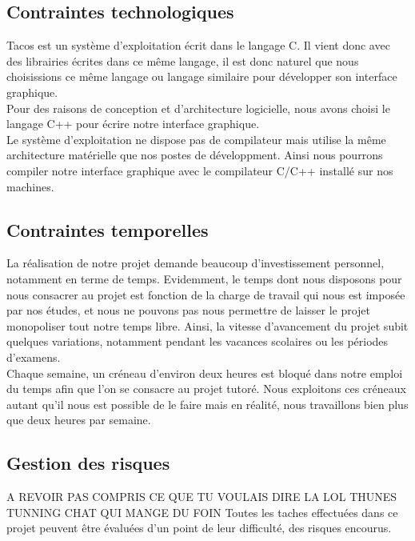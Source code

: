 
\subsection{Contraintes technologiques}

Tacos est un système d'exploitation écrit dans le langage C. Il vient donc avec des librairies écrites dans ce même langage, il est donc naturel que nous choisissions ce même langage ou langage similaire pour développer son interface graphique. \\

Pour des raisons de conception et d'architecture logicielle, nous avons choisi le langage C++ pour écrire notre interface graphique. \\
Le système d'exploitation ne dispose pas de compilateur mais utilise la même architecture matérielle que nos postes de développment. Ainsi nous pourrons compiler notre interface graphique avec le compilateur C/C++ installé sur nos machines.

\subsection{Contraintes temporelles}

La réalisation de notre projet demande beaucoup d'investissement personnel, notamment en terme de temps. Evidemment, le temps dont nous disposons pour nous consacrer au projet est fonction de la charge de travail qui nous est imposée par nos études, et nous ne pouvons pas nous permettre de laisser le projet monopoliser tout notre temps libre. Ainsi, la vitesse d'avancement du projet subit quelques variations, notamment pendant les vacances scolaires ou les périodes d'examens. \\

Chaque semaine, un créneau d'environ deux heures est bloqué dans notre emploi du temps afin que l'on se consacre au projet tutoré. Nous exploitons ces créneaux autant qu'il nous est possible de le faire mais en réalité, nous travaillons bien plus que deux heures par semaine.
\subsection{Gestion des risques}
A REVOIR PAS COMPRIS CE QUE TU VOULAIS DIRE LA LOL THUNES TUNNING CHAT QUI MANGE DU FOIN Toutes les taches effectuées dans ce projet peuvent être évaluées d'un point de leur difficulté, des risques encourus.
